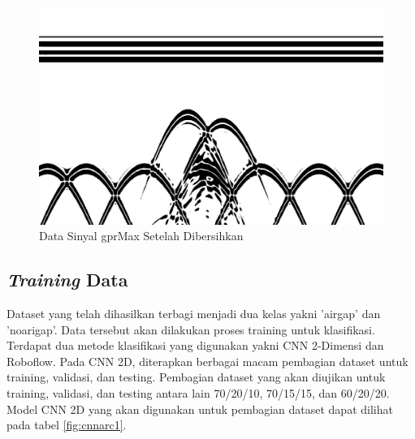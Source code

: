 \begin{figure} [H] \centering
  \includegraphics[scale=0.1]{gambar/bab3/binary.jpg}
  \caption{Data Sinyal gprMax Setelah Dibersihkan}
  \label{fig:binary}
\end{figure}

\subsection{\emph{Training} Data}
Dataset yang telah dihasilkan terbagi menjadi dua kelas yakni 'airgap' dan 'noarigap'. Data tersebut akan dilakukan proses training untuk klasifikasi. Terdapat dua metode klasifikasi yang digunakan yakni CNN 2-Dimensi dan Roboflow. Pada CNN 2D, diterapkan berbagai macam pembagian dataset untuk training, validasi, dan testing. Pembagian dataset yang akan diujikan untuk training, validasi, dan testing antara lain 70/20/10, 70/15/15, dan 60/20/20. Model CNN 2D yang akan digunakan untuk pembagian dataset dapat dilihat pada tabel \ref{fig:cnnarc1}.

